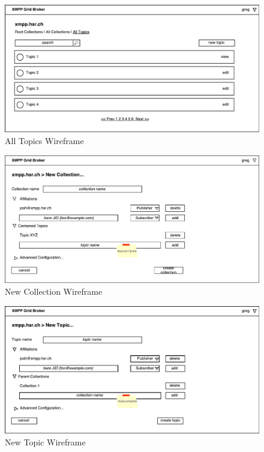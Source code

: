 \begin{figure}[h]
    \centering
    \includegraphics[width=1\linewidth]{resources/wireframe_4}
    \caption{All Topics Wireframe}
\end{figure}

\begin{figure}[h]
    \centering
    \includegraphics[width=1\linewidth]{resources/wireframe_5}
    \caption{New Collection Wireframe}
\end{figure}

\begin{figure}[h]
    \centering
    \includegraphics[width=1\linewidth]{resources/wireframe_6}
    \caption{New Topic Wireframe}
\end{figure}

